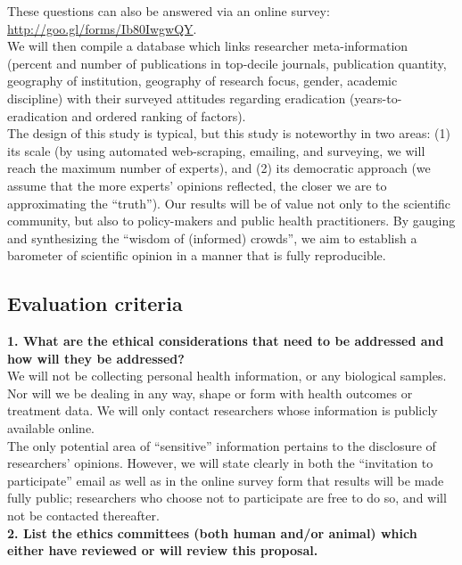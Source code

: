 \documentclass{article}
\begin{document}
\noindent These questions can also be answered via an online survey: \href{http://goo.gl/forms/Ib80IwgwQY}{http://goo.gl/forms/Ib80IwgwQY}. \\


\noindent We will then compile a database which links researcher meta-information (percent and number of publications in top-decile journals, publication quantity, geography of institution, geography of research focus, gender, academic discipline) with their surveyed attitudes regarding eradication (years-to-eradication and ordered ranking of factors). \\


\noindent The design of this study is typical, but this study is noteworthy in two areas: (1) its scale (by using automated web-scraping, emailing, and surveying, we will reach the maximum number of experts), and (2) its democratic approach (we assume that the more experts’ opinions reflected, the closer we are to approximating the “truth”). Our results will be of value not only to the scientific community, but also to policy-makers and public health practitioners. By gauging and synthesizing the “wisdom of (informed) crowds”, we aim to establish a barometer of scientific opinion in a manner that is fully reproducible.


\subsection*{Evaluation criteria}


\noindent \textbf{1. What are the ethical considerations that need to be addressed and how will they be addressed?} \\
We will not be collecting personal health information, or any biological samples. Nor will we be dealing in any way, shape or form with health outcomes or treatment data.
We will only contact researchers whose information is publicly available online.   \\

\noindent The only potential area of “sensitive” information pertains to the disclosure of researchers’ opinions. However, we will state clearly in both the “invitation to participate” email as well as in the online survey form that results will be made fully public; researchers who choose not to participate are free to do so, and will not be contacted thereafter.  \\


\noindent \textbf{2. List the ethics committees (both human and/or animal) which either have reviewed or will review this proposal.} \\
\end{document}

